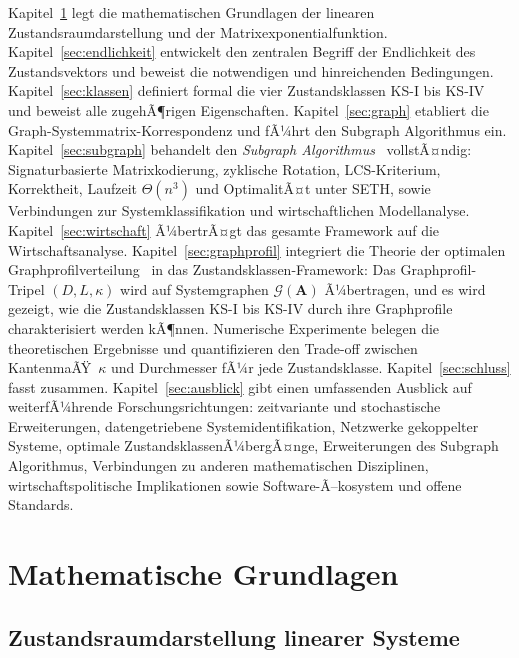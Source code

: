 ﻿\documentclass[12pt, a4paper, titlepage]{report}
\theoremstyle{definition}
\theoremstyle{remark}
\newcommand{\vA}{\bm{A}}
\begin{document}
Kapitel~\ref{sec:grundlagen} legt die mathematischen Grundlagen der linearen
Zustandsraumdarstellung und der Matrixexponentialfunktion. Kapitel~\ref{sec:endlichkeit}
entwickelt den zentralen Begriff der Endlichkeit des Zustandsvektors und beweist die
notwendigen und hinreichenden Bedingungen. Kapitel~\ref{sec:klassen} definiert formal
die vier Zustandsklassen KS-I bis KS-IV und beweist alle zugehÃ¶rigen Eigenschaften.
Kapitel~\ref{sec:graph} etabliert die Graph-Systemmatrix-Korrespondenz und fÃ¼hrt den
Subgraph Algorithmus ein. Kapitel~\ref{sec:subgraph} behandelt den
\emph{Subgraph Algorithmus}~\citep{epp2026subgraph} vollstÃ¤ndig: Signaturbasierte
Matrixkodierung, zyklische Rotation, LCS-Kriterium, Korrektheit, Laufzeit $\Theta(n^3)$
und OptimalitÃ¤t unter SETH, sowie Verbindungen zur Systemklassifikation und
wirtschaftlichen Modellanalyse. Kapitel~\ref{sec:wirtschaft} Ã¼bertrÃ¤gt das gesamte
Framework auf die Wirtschaftsanalyse.
Kapitel~\ref{sec:graphprofil} integriert die Theorie der optimalen
Graphprofilverteilung~\citep{epp2026graphs} in das Zustandsklassen-Framework:
Das Graphprofil-Tripel $(D, L, \kappa)$ wird auf Systemgraphen $\mathcal{G}(\vA)$
Ã¼bertragen, und es wird gezeigt, wie die Zustandsklassen KS-I bis KS-IV durch
ihre Graphprofile charakterisiert werden kÃ¶nnen. Numerische Experimente belegen die
theoretischen Ergebnisse und quantifizieren den Trade-off zwischen KantenmaÃŸ~$\kappa$
und Durchmesser fÃ¼r jede Zustandsklasse.
Kapitel~\ref{sec:schluss} fasst zusammen.
Kapitel~\ref{sec:ausblick} gibt einen umfassenden Ausblick auf weiterfÃ¼hrende
Forschungsrichtungen: zeitvariante und stochastische Erweiterungen, datengetriebene
Systemidentifikation, Netzwerke gekoppelter Systeme, optimale ZustandsklassenÃ¼bergÃ¤nge,
Erweiterungen des Subgraph Algorithmus, Verbindungen zu anderen mathematischen
Disziplinen, wirtschaftspolitische Implikationen sowie Software-Ã–kosystem und
offene Standards.

\chapter{Mathematische Grundlagen}
\label{sec:grundlagen}

\section{Zustandsraumdarstellung linearer Systeme}
\end{document}
